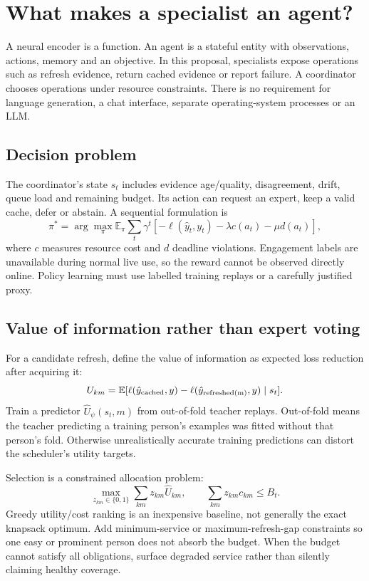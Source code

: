 \documentclass[10pt,a4paper]{article}
\newcommand{\E}{\mathbb{E}}
\begin{document}
\section{What makes a specialist an agent?}
A neural encoder is a function. An agent is a stateful entity with observations, actions, memory and an objective. In this proposal, specialists expose operations such as refresh evidence, return cached evidence or report failure. A coordinator chooses operations under resource constraints. There is no requirement for language generation, a chat interface, separate operating-system processes or an LLM.

\subsection{Decision problem}
The coordinator's state $s_t$ includes evidence age/quality, disagreement, drift, queue load and remaining budget. Its action can request an expert, keep a valid cache, defer or abstain. A sequential formulation is
\begin{equation}
\pi^*=\arg\max_\pi\E_\pi\sum_t\gamma^t
[-\ell(\hat y_t,y_t)-\lambda c(a_t)-\mu d(a_t)],
\end{equation}
where $c$ measures resource cost and $d$ deadline violations. Engagement labels are unavailable during normal live use, so the reward cannot be observed directly online. Policy learning must use labelled training replays or a carefully justified proxy.

\subsection{Value of information rather than expert voting}
For a candidate refresh, define the value of information as expected loss reduction after acquiring it:
\begin{equation}
U_{km}=\E[\ell(\hat y_{\rm cached},y)-\ell(\hat y_{\rm refreshed(m)},y)\mid s_t].
\end{equation}
Train a predictor $\hat U_\psi(s_t,m)$ from out-of-fold teacher replays. Out-of-fold means the teacher predicting a training person's examples was fitted without that person's fold. Otherwise unrealistically accurate training predictions can distort the scheduler's utility targets.

Selection is a constrained allocation problem:
\begin{equation}
\max_{z_{km}\in\{0,1\}}\sum_{km}z_{km}\hat U_{km},\qquad
\sum_{km}z_{km}c_{km}\leq B_t.
\end{equation}
Greedy utility/cost ranking is an inexpensive baseline, not generally the exact knapsack optimum. Add minimum-service or maximum-refresh-gap constraints so one easy or prominent person does not absorb the budget. When the budget cannot satisfy all obligations, surface degraded service rather than silently claiming healthy coverage.
\end{document}
